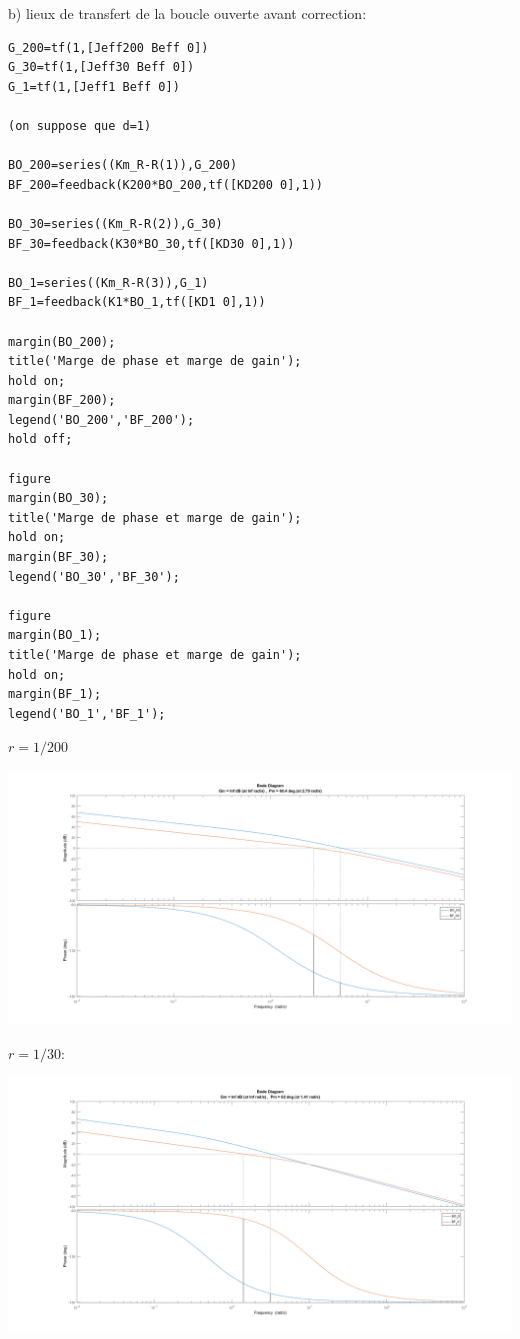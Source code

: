 \documentclass[12pt]{article}
\begin{document}
b) lieux de transfert de la boucle ouverte avant correction:
\begin{lstlisting}[style=Matlab-editor]
G_200=tf(1,[Jeff200 Beff 0])
G_30=tf(1,[Jeff30 Beff 0])
G_1=tf(1,[Jeff1 Beff 0])

(on suppose que d=1)

BO_200=series((Km_R-R(1)),G_200)
BF_200=feedback(K200*BO_200,tf([KD200 0],1))

BO_30=series((Km_R-R(2)),G_30)
BF_30=feedback(K30*BO_30,tf([KD30 0],1))

BO_1=series((Km_R-R(3)),G_1)
BF_1=feedback(K1*BO_1,tf([KD1 0],1))

margin(BO_200);
title('Marge de phase et marge de gain');
hold on;
margin(BF_200);
legend('BO_200','BF_200');
hold off;

figure
margin(BO_30);
title('Marge de phase et marge de gain');
hold on;
margin(BF_30);
legend('BO_30','BF_30');

figure
margin(BO_1);
title('Marge de phase et marge de gain');
hold on;
margin(BF_1);
legend('BO_1','BF_1');

\end{lstlisting}

\clearpage
$r=1/200$
\begin{flushleft}
\includegraphics[width=\textwidth,height=\textheight,keepaspectratio]{Bode_200.PNG}
\end{flushleft}

$r=1/30$:
\begin{flushleft}
\includegraphics[width=\textwidth,height=\textheight,keepaspectratio]{Bode_30.PNG}
\end{flushleft}
\end{document}
